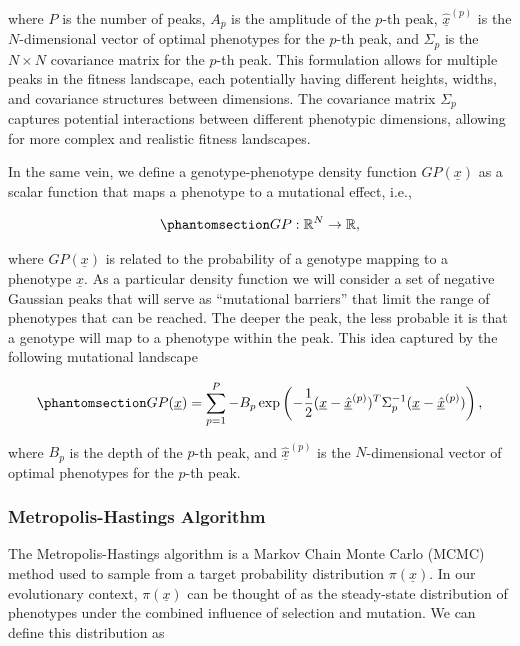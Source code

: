 \documentclass[
]{scrartcl}
\begin{document}
\begin{refsection}
where \(P\) is the number of peaks, \(A_p\) is the amplitude of the
\(p\)-th peak, \(\underline{\hat{x}}^{(p)}\) is the \(N\)-dimensional
vector of optimal phenotypes for the \(p\)-th peak, and \(\Sigma_p\) is
the \(N \times N\) covariance matrix for the \(p\)-th peak. This
formulation allows for multiple peaks in the fitness landscape, each
potentially having different heights, widths, and covariance structures
between dimensions. The covariance matrix \(\Sigma_p\) captures
potential interactions between different phenotypic dimensions, allowing
for more complex and realistic fitness landscapes.

In the same vein, we define a genotype-phenotype density function
\(GP(\underline{x})\) as a scalar function that maps a phenotype to a
mutational effect, i.e.,

\begin{equation}\phantomsection\label{eq-genotype-phenotype-density}{
GP: \mathbb{R}^N \to \mathbb{R},
}\end{equation}

where \(GP(\underline{x})\) is related to the probability of a genotype
mapping to a phenotype \(\underline{x}\). As a particular density
function we will consider a set of negative Gaussian peaks that will
serve as ``mutational barriers'' that limit the range of phenotypes that
can be reached. The deeper the peak, the less probable it is that a
genotype will map to a phenotype within the peak. This idea captured by
the following mutational landscape

\begin{equation}\phantomsection\label{eq-genotype-phenotype-density-peaks}{
GP(\underline{x}) = 
\sum_{p=1}^P -B_p 
\exp\left(
    -\frac{1}{2}
    (\underline{x} - \underline{\hat{x}}^{(p)})^T 
    \Sigma_p^{-1} 
    (\underline{x} - \underline{\hat{x}}^{(p)})
\right),
}\end{equation}

where \(B_p\) is the depth of the \(p\)-th peak, and
\(\underline{\hat{x}}^{(p)}\) is the \(N\)-dimensional vector of optimal
phenotypes for the \(p\)-th peak.

\subsubsection{Metropolis-Hastings
Algorithm}\label{metropolis-hastings-algorithm}

The Metropolis-Hastings algorithm is a Markov Chain Monte Carlo (MCMC)
method used to sample from a target probability distribution
\(\pi(\underline{x})\). In our evolutionary context,
\(\pi(\underline{x})\) can be thought of as the steady-state
distribution of phenotypes under the combined influence of selection and
mutation. We can define this distribution as


\end{refsection}
\end{document}

